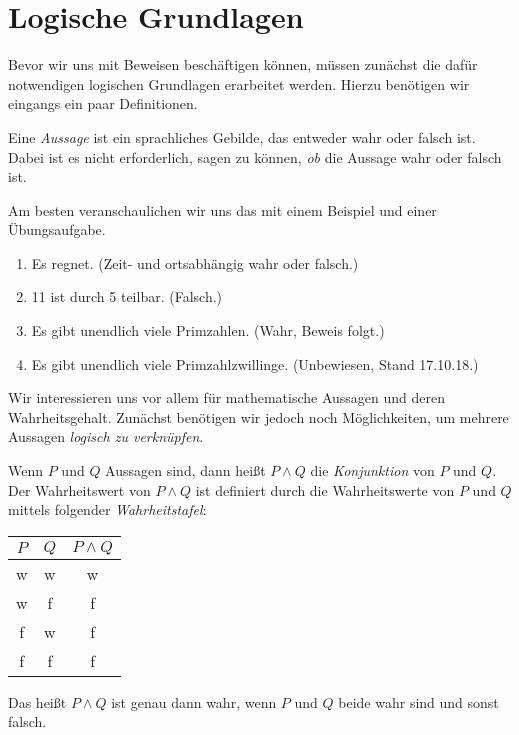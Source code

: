 \section{Logische Grundlagen}

\begin{frame}
Bevor wir uns mit Beweisen beschäftigen können, müssen zunächst die dafür
notwendigen logischen Grundlagen erarbeitet werden.
Hierzu benötigen wir eingangs ein paar Definitionen.
\end{frame}


\begin{frame}
\begin{mydef}
Eine \textit{Aussage} ist ein sprachliches Gebilde, das entweder wahr oder
falsch ist.
Dabei ist es nicht erforderlich, sagen zu können, \textit{ob} die Aussage wahr
oder falsch ist.
\end{mydef}
\end{frame}


\begin{frame}
Am besten veranschaulichen wir uns das mit einem Beispiel und einer Übungsaufgabe.

\begin{example}
\begin{enumerate}
\item Es regnet. (Zeit- und ortsabhängig wahr oder falsch.)
\item 11 ist durch 5 teilbar. (Falsch.)
\item Es gibt unendlich viele Primzahlen. (Wahr, Beweis folgt.)
\item Es gibt unendlich viele Primzahlzwillinge. (Unbewiesen, Stand 17.10.18.)
\end{enumerate}
\end{example}
\end{frame}


\begin{frame}
Wir interessieren uns vor allem für mathematische Aussagen und deren
Wahrheitsgehalt.
Zunächst benötigen wir jedoch noch Möglichkeiten, um mehrere Aussagen
\textit{logisch zu verknüpfen}.
\end{frame}


\begin{frame}
\begin{mydef}
Wenn $P$ und $Q$ Aussagen sind, dann heißt $P \wedge Q$ die
\textit{Konjunktion} von $P$ und $Q$.
Der Wahrheitswert von $P \wedge Q$ ist definiert durch die Wahrheitswerte von
$P$ und $Q$ mittels folgender \textit{Wahrheitstafel}:

\begin{table}[H]
\centering
\begin{tabular}{c|c|c}
$P$ & $Q$ & $P \wedge Q$ \\ \hline
w   & w   & w \\
w   & f   & f \\
f   & w   & f \\
f   & f   & f
\end{tabular}
\end{table}

Das heißt $P \wedge Q$ ist genau dann wahr, wenn $P$ und $Q$ beide wahr sind
und sonst falsch.
\end{mydef}
\end{frame}


